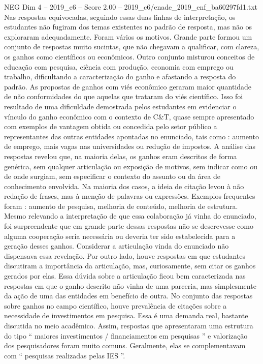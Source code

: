 \begin{textsample}{NEG Dim 4 – 2019\_c6 – Score 2.00 – 2019\_c6/enade\_2019\_enf\_ba60297fd1.txt}
Nas respostas equivocadas, seguindo essas duas linhas de interpretação, os estudantes não fugiram dos temas existentes no padrão de resposta, mas não os exploraram adequadamente.
Foram vários os motivos.
Grande parte formou um conjunto de respostas muito sucintas, que não chegavam a qualificar, com clareza, os ganhos como científicos ou econômicos.
Outro conjunto misturou conceitos de educação com pesquisa, ciência com produção, economia com emprego ou trabalho, dificultando a caracterização do ganho e afastando a resposta do padrão.
As propostas de ganhos com viés econômico geraram maior quantidade de não conformidades do que aquelas que trataram do viés científico.
Isso foi resultado de uma dificuldade demostrada pelos estudantes em evidenciar o vínculo do ganho econômico com o contexto de C\&T, quase sempre apresentado com exemplos de vantagem obtida ou concedida pelo setor público a representantes das outras entidades apontadas no enunciado, tais como : aumento de emprego, mais vagas nas universidades ou redução de impostos.
A análise das respostas revelou que, na maioria delas, os ganhos eram descritos de forma genérica, sem qualquer articulação ou exposição de motivos, sem indicar como ou de onde surgiam, sem especificar o contexto do assunto ou da área de conhecimento envolvida.
Na maioria dos casos, a ideia de citação levou à não redação de frases, mas à menção de palavras ou expressões.
Exemplos frequentes foram : aumento de pesquisa, melhoria de conteúdo, melhoria de estrutura.
Mesmo relevando a interpretação de que essa colaboração já vinha do enunciado, foi surpreendente que em grande parte dessas respostas não se descrevesse como alguma cooperação seria necessária ou deveria ter sido estabelecida para a geração desses ganhos.
Considerar a articulação vinda do enunciado não dispensava essa revelação.
Por outro lado, houve respostas em que estudantes discutiram a importância da articulação, mas, curiosamente, sem citar os ganhos gerados por elas.
Essa dúvida sobre a articulação ficou bem caracterizada nas respostas em que o ganho descrito não vinha de uma parceria, mas simplesmente da ação de uma das entidades em benefício de outra.
No conjunto das respostas sobre ganhos no campo científico, houve prevalência de citações sobre a necessidade de investimentos em pesquisa.
Essa é uma demanda real, bastante discutida no meio acadêmico.
Assim, respostas que apresentaram uma estrutura do tipo “ maiores investimentos / financiamentos em pesquisas ” e valorização dos pesquisadores foram muito comuns.
Geralmente, elas se complementavam com “ pesquisas realizadas pelas IES ”.

\end{textsample}
